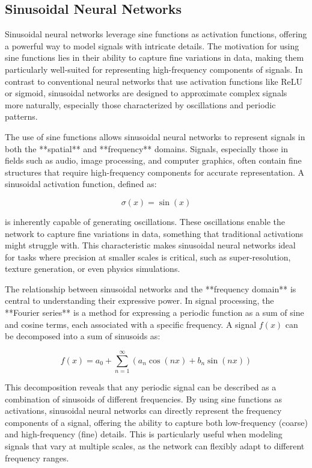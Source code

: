 \subsection{Sinusoidal Neural Networks}

Sinusoidal neural networks leverage sine functions as activation functions, offering a powerful way to model signals with intricate details. The motivation for using sine functions lies in their ability to capture fine variations in data, making them particularly well-suited for representing high-frequency components of signals. In contrast to conventional neural networks that use activation functions like ReLU or sigmoid, sinusoidal networks are designed to approximate complex signals more naturally, especially those characterized by oscillations and periodic patterns.

The use of sine functions allows sinusoidal neural networks to represent signals in both the **spatial** and **frequency** domains. Signals, especially those in fields such as audio, image processing, and computer graphics, often contain fine structures that require high-frequency components for accurate representation. A sinusoidal activation function, defined as:

\[
\sigma(x) = \sin(x)
\]

is inherently capable of generating oscillations. These oscillations enable the network to capture fine variations in data, something that traditional activations might struggle with. This characteristic makes sinusoidal neural networks ideal for tasks where precision at smaller scales is critical, such as super-resolution, texture generation, or even physics simulations.

The relationship between sinusoidal networks and the **frequency domain** is central to understanding their expressive power. In signal processing, the **Fourier series** is a method for expressing a periodic function as a sum of sine and cosine terms, each associated with a specific frequency. A signal \(f(x)\) can be decomposed into a sum of sinusoids as:

\[
f(x) = a_0 + \sum_{n=1}^{\infty} \left( a_n \cos(n x) + b_n \sin(n x) \right)
\]

This decomposition reveals that any periodic signal can be described as a combination of sinusoids of different frequencies. By using sine functions as activations, sinusoidal neural networks can directly represent the frequency components of a signal, offering the ability to capture both low-frequency (coarse) and high-frequency (fine) details. This is particularly useful when modeling signals that vary at multiple scales, as the network can flexibly adapt to different frequency ranges.

